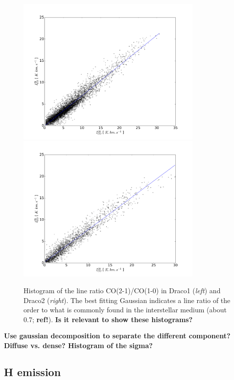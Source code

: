 \documentclass[traditabstract]{aa}
\begin{document}
\begin{figure}[h!]
  \centering
  \includegraphics[page=2,height=7.3cm,trim=60 30 90 75,clip=true]{Figures/Draco1_CO21-CO10.pdf}
  \hspace{3mm}
  \includegraphics[page=2,height=7.3cm,trim=70 30 90 75,clip=true]{Figures/Draco2_CO21-CO10.pdf}
  \caption{\label{ratio} Histogram of the line ratio CO(2-1)/CO(1-0) in Draco1 (\emph{left}) and Draco2 (\emph{right}). The best fitting Gaussian indicates a line ratio of the order to what is commonly found in the interstellar medium (about 0.7; \textbf{ref!}). \textbf{Is it relevant to show these histograms?}}
\end{figure}

\textbf{Use gaussian decomposition to separate the different component? Diffuse vs. dense? Histogram of the sigma?}

\subsection{H emission}
\label{sec:HI-data}
\end{document}
